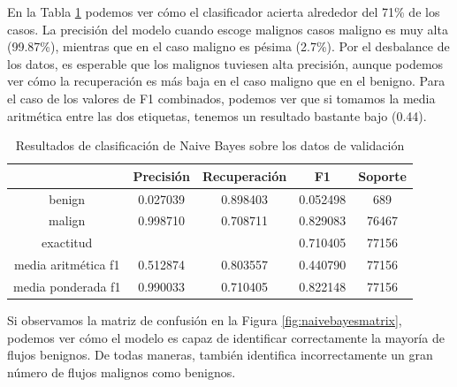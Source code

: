 En la Tabla \ref{table:naivebayesresults} podemos ver cómo el clasificador acierta alrededor del 71\% de los casos. La precisión del modelo cuando escoge malignos casos maligno es muy alta (99.87\%), mientras que en el caso maligno es pésima (2.7\%). Por el desbalance de los datos, es esperable que los malignos tuviesen alta precisión, aunque podemos ver cómo la recuperación es más baja en el caso maligno que en el benigno. Para el caso de los valores de F1 combinados, podemos ver que si tomamos la media aritmética entre las dos etiquetas, tenemos un resultado bastante bajo (0.44).

\begin{table}[H]
    \begin{center}
        \begin{tabular}{|c | c c c | c |} 
            \hline
            & \textbf{Precisión} & \textbf{Recuperación} & \textbf{F1}  & \textbf{Soporte} \\
            \hline
            benign               & 0.027039 & 0.898403 & 0.052498  &   689 \\
            malign               & 0.998710 & 0.708711 & 0.829083  & 76467 \\
            \hline
            exactitud            &          &          & 0.710405  & 77156 \\
            media aritmética f1  & 0.512874 & 0.803557 & 0.440790  & 77156 \\
            media ponderada f1   & 0.990033 & 0.710405 & 0.822148  & 77156 \\
            \hline
        \end{tabular}
    \end{center}
    \caption{Resultados de clasificación de Naive Bayes sobre los datos de validación}
    \label{table:naivebayesresults}
\end{table}

Si observamos la matriz de confusión en la Figura \ref{fig:naivebayesmatrix}, podemos ver cómo el modelo es capaz de identificar correctamente la mayoría de flujos benignos. De todas maneras, también identifica incorrectamente un gran número de flujos malignos como benignos.

